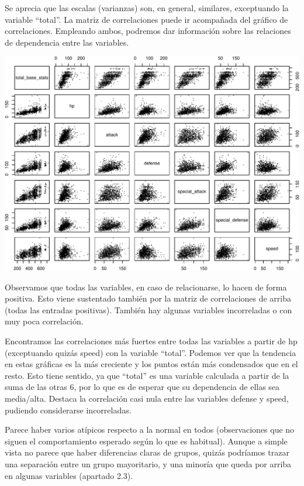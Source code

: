 \documentclass[
  12pt,
]{extreport}
\begin{document}
Se aprecia que las escalas (varianzas) son, en general, similares,
exceptuando la variable ``total''. La matriz de correlaciones puede ir
acompañada del gráfico de correlaciones. Empleando ambos, podremos dar
información sobre las relaciones de dependencia entre las variables.

\begin{center}
\includegraphics{trabajo_files/figure-pdf/unnamed-chunk-10-1.pdf}
\end{center}

Observamos que todas las variables, en caso de relacionarse, lo hacen de
forma positiva. Esto viene sustentado también por la matriz de
correlaciones de arriba (todas las entradas positivas). También hay
algunas variables incorreladas o con muy poca correlación.

Encontramos las correlaciones más fuertes entre todas las variables a
partir de hp (exceptuando quizás speed) con la variable ``total''.
Podemos ver que la tendencia en estas gráficas es la más creciente y los
puntos están más condensados que en el resto. Esto tiene sentido, ya que
``total'' es una variable calculada a partir de la suma de las otras 6,
por lo que es de esperar que su dependencia de ellas sea media/alta.
Destaca la correlación casi nula entre las variables defense y speed,
pudiendo considerarse incorreladas.

Parece haber varios atípicos respecto a la normal en todos
(observaciones que no siguen el comportamiento esperado según lo que es
habitual). Aunque a simple vista no parece que haber diferencias claras
de grupos, quizás podríamos trazar una separación entre un grupo
mayoritario, y una minoría que queda por arriba en algunas variables
(apartado 2.3).
\end{document}
